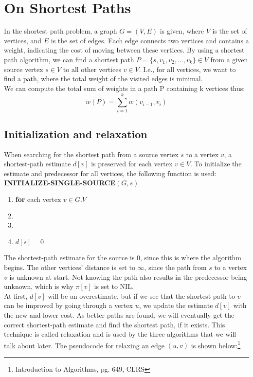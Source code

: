 \documentclass[11pt]{article}
\begin{document}
\section{On Shortest Paths}
In the shortest path problem, a graph $G = (V,E)$ is given, where $V$	
is the set of vertices, and $E$ is the set of edges. Each edge
connects two vertices and contains a weight, indicating the cost of
moving between these vertices. By using a shortest path algorithm, we
can find a shortest path $P = \{s, v_{1}, v_{2}, ..., v_{k}\} \in V$ from a
given source vertex $s \in V$ to all other vertices $v \in V$. I.e., for all vertices, we want to find a path, where the total weight of the visited edges is minimal.\\

\noindent We can compute the total sum of weights in a path P containing k vertices thus:\\
$$w(P) = \displaystyle\sum_{i=1}^{k} w(v_{i-1},v_i)$$

\noindent
\subsection{Initialization and relaxation}
When searching for the shortest path from a source vertex $s$ to a
vertex $v$, a shortest-path estimate $d[v]$ is preserved for each
vertex $v \in V$. To initialize the estimate and predecessor for all vertices, the following function is used:\\

\textbf{INITIALIZE-SINGLE-SOURCE$(G, s)$}
\begin{enumerate}
\setlength\itemsep{0em}
\item \textbf{for } each vertex $v \in G.V$
\item {}
\item {}
\item $d[s] = 0$
\end{enumerate}
The shortest-path estimate for the source is 0, since this is where the algorithm begins. The other vertices' distance is set to $\infty$, since the path from $s$ to a vertex $v$ is unknown at start. Not knowing the path also results in the predecessor being unknown, which is why $\pi[v]$ is set to NIL.\\
At first, $d[v]$ will be an overestimate, but if we see that the shortest path to $v$ can be improved by going through a vertex $u$, we update the estimate $d[v]$ with the new and lower cost. As better paths are found, we will eventually get the correct shortest-path estimate and find the shortest path, if it exists. This technique is called relaxation and is used by the three algorithms that we will talk about later. The pseudocode for relaxing an edge $(u,v) $ is shown below:\footnote{Introduction to Algorithms, pg. 649, CLRS}\\
\end{document}
